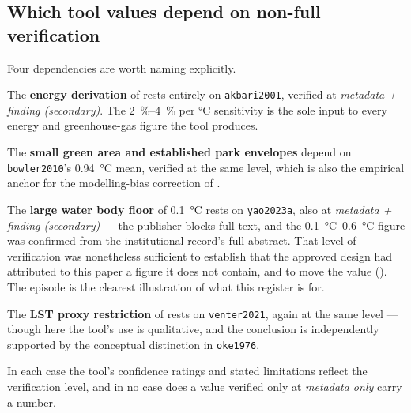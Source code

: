 \subsection*{Which tool values depend on non-full verification}

Four dependencies are worth naming explicitly.

The \textbf{energy derivation} of  rests entirely on
\texttt{akbari2001}, verified at \emph{metadata + finding (secondary)}. The
\SIrange{2}{4}{\percent} per \si{\degreeCelsius} sensitivity is the sole input
to every energy and greenhouse-gas figure the tool produces.

The \textbf{small green area and established park envelopes} depend on
\texttt{bowler2010}'s \qty{0.94}{\degreeCelsius} mean, verified at the same
level, which is also the empirical anchor for the modelling-bias correction of
.

The \textbf{large water body floor} of \qty{0.1}{\degreeCelsius} rests on
\texttt{yao2023a}, also at \emph{metadata + finding (secondary)} --- the
publisher blocks full text, and the
\SIrange{0.1}{0.6}{\degreeCelsius} figure was confirmed from the institutional
record's full abstract. That level of verification was nonetheless sufficient
to establish that the approved design had attributed to this paper a figure it
does not contain, and to move the value (). The episode is
the clearest illustration of what this register is for.

The \textbf{LST proxy restriction} of  rests on
\texttt{venter2021}, again at the same level --- though here the tool's use is
qualitative, and the conclusion is independently supported by the conceptual
distinction in \texttt{oke1976}.

In each case the tool's confidence ratings and stated limitations reflect the
verification level, and in no case does a value verified only at
\emph{metadata only} carry a number.

